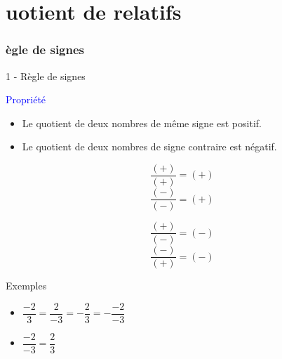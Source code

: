 \documentclass{beamer}
\begin{document}
\section{uotient de relatifs}

\begin{frame}
  \frametitle{ègle de signes}

  \alert{1 - Règle de signes}

  \begin{block}{\textcolor{blue}{Propriété}}
    \begin{itemize}
    \item Le quotient de deux nombres de même signe est positif.
    \item Le quotient de deux nombres de signe contraire est négatif.
    \end{itemize}

    \begin{multicols}{2}
      $$ \dfrac{ (+) }{ (+) }= (+)$$
      $$ \dfrac{ (-) }{ (-) }= (+)$$

      $$ \dfrac{ (+) }{ (-) }= (-)$$
      $$ \dfrac{ (-) }{ (+) }= (-)$$
    \end{multicols}
  \end{block}

  \begin{exampleblock}{Exemples}
    \begin{multicols}{2}
      \begin{itemize}
      \item $ \dfrac{-2}{3} = \dfrac{2}{-3} = -\dfrac{2}{3} = -\dfrac{-2}{-3}$ 
      \item $ \dfrac{-2}{-3} = \dfrac{2}{3}$ 
      \end{itemize}
    \end{multicols}
  \end{exampleblock}

\end{frame}
\end{document}
